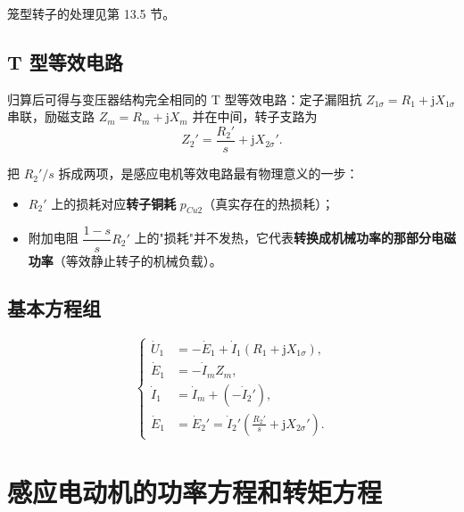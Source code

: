 笼型转子的处理见第 13.5 节。

\subsection{T 型等效电路}
归算后可得与变压器结构完全相同的 T 型等效电路：定子漏阻抗 $Z_{1\sigma}=R_1+\mathrm{j}X_{1\sigma}$ 串联，励磁支路 $Z_m=R_m+\mathrm{j}X_m$ 并在中间，转子支路为
\begin{equation}
Z_2'=\frac{R_2'}{s}+\mathrm{j}X_{2\sigma}' .
\end{equation}


把 $R_2'/s$ 拆成两项，是感应电机等效电路最有物理意义的一步：
\begin{itemize}
  \item $R_2'$ 上的损耗对应\textbf{转子铜耗} $p_{Cu2}$（真实存在的热损耗）；
  \item 附加电阻 $\dfrac{1-s}{s}R_2'$ 上的"损耗"并不发热，它代表\textbf{转换成机械功率的那部分电磁功率}（等效静止转子的机械负载）。
\end{itemize}

\subsection{基本方程组}
\begin{equation}
\left\{
\begin{aligned}
\dot U_1&=-\dot E_1+\dot I_1\left(R_1+\mathrm{j}X_{1\sigma}\right),\\
\dot E_1&=-\dot I_mZ_m,\\
\dot I_1&=\dot I_m+\left(-\dot I_2'\right),\\
\dot E_1&=\dot E_2'=\dot I_2'\left(\frac{R_2'}{s}+\mathrm{j}X_{2\sigma}'\right).
\end{aligned}
\right.
\end{equation}

\section{感应电动机的功率方程和转矩方程}

